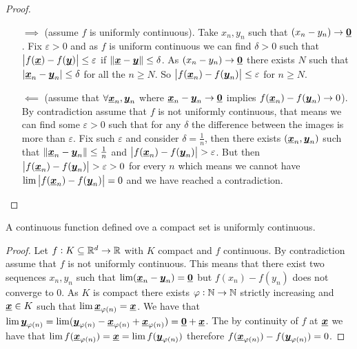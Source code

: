 \documentclass[12pt]{extarticle}
\renewcommand{\vec}[1]{\uvec{#1}}
\begin{document}
\begin{proof}
    \skiplineafterproof
    \begin{itemize}
        \item[$\implies$] (assume $f$ is uniformly continuous).
              Take $x_n, y_n$ such that $(x_n - y_n) \to \vec 0$.
              Fix $\varepsilon > 0$ and as $f$ is uniform continuous we can find $\delta > 0$ such that $\abs{f(\vec x) - f(\vec y)} \leq \varepsilon$ if $\norm{\vec x - \vec y} \leq \delta$.
              As $(x_n - y_n) \to \vec 0$ there exists $N$ such that $\abs{\vec x_n - \vec y_n} \leq \delta$ for all the $n \geq N$. So $\abs{f(\vec x_n) - f(\vec y_n)} \leq \varepsilon$ for $n \geq N$.
        \item[$\impliedby$] (assume that $\forall \vec x_n, \vec y_n$ where $\vec x_n - \vec y_n \to \vec 0$ implies $f(\vec x_n) - f(\vec y_n) \to 0$).
              By contradiction assume that $f$ is not uniformly continuous, that means we can find some $\varepsilon > 0$ such that for any $\delta$ the difference between the images is more than $\varepsilon$.
              Fix such $\varepsilon$ and consider $\delta = \frac{1}{n}$, then there exists $(\vec x_n, \vec y_n)$ such that $\norm{\vec x_n - \vec y_n} \leq \frac{1}{n}$ and $\abs{f(\vec x_n) - f(\vec y_n)} > \varepsilon$.
              But then $\abs{f(\vec x_n) - f(\vec y_n)} > \varepsilon > 0$ for every $n$ which means we cannot have $\lim \abs{f(\vec x_n) - f(\vec y_n)} = 0$ and we have reached a contradiction.
    \end{itemize}
\end{proof}

\begin{theorem}[heine]
    A continuous function defined ove a compact set is uniformly continuous.
\end{theorem}

\begin{proof}
    Let $f: K \subseteq \mathbb{R}^d \to \mathbb{R}$ with $K$ compact and $f$ continuous.
    By contradiction assume that $f$ is not uniformly continuous.
    This means that there exist two sequences $x_n, y_n$ such that $\lim (\vec x_n - \vec y_n) = \vec 0$ but $f(x_n) - f(y_n)$ does not converge to $0$.
    As $K$ is compact there exists $\varphi: \mathbb{N} \to \mathbb{N}$ strictly increasing and $\vec x \in K$ such that $\lim \vec x_{\varphi(n)} = \vec x$.
    We have that $\lim \vec y_{\varphi(n)} = \lim (\vec y_{\varphi(n)} - \vec x_{\varphi(n)} + \vec x_{\varphi(n)}) = \vec 0 + \vec x$.
    The by continuity of $f$ at $\vec x$ we have that $\lim f(\vec x_{\varphi(n)}) = \vec x = \lim f(\vec y_{\varphi(n)})$ therefore $f(\vec x_{\varphi(n)}) - f(\vec y_{\varphi(n)}) = 0$.
\end{proof}
\end{document}
